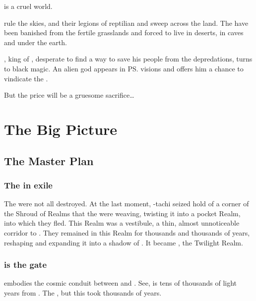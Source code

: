 \begin{blurb}
  \Miith{} is a cruel world. 
  
  \Dragons{} rule the skies, and their legions of reptilian \cregorrs{} and \scathae{} sweep across the land. 
  The \nephilim{} have been banished from the fertile grasslands and forced to live in deserts, in caves and under the earth. 
  
  \Semiza, \nephilic{} king of \Numah, desperate to find a way to save his people from the \psp{\dragons}{} depredations, turns to black magic. 
  An alien god appears in \ps{\Semiza}{} visions and offers him a chance to vindicate the \nephilim. 
  
  But the price will be a gruesome sacrifice\ldots{}
\end{blurb}
















\section{The Big Picture}
\subsection{The \Bane{} Master Plan}
\subsubsection{The \banes{} in exile}
The \banelords{} were not all destroyed. At the last moment, \Daggerrain-tachi seized hold of a corner of the Shroud of Realms that the \ophidians{} were weaving, twisting it into a pocket Realm, into which they fled. This Realm was a vestibule, a thin, almost unnoticeable corridor to \Erebos. They remained in this Realm for thousands and thousands of years, reshaping and expanding it into a shadow of \Erebos. It became \Nyx, the Twilight Realm. 





\subsubsection{\Daggerrain{} is the gate}
\Daggerrain{} embodies the cosmic conduit between \Erebos{} and \Nyx. See, \Erebos{} is tens of thousands of light years from \Miith{}. The \banes{} , but this took thousands of years. 

